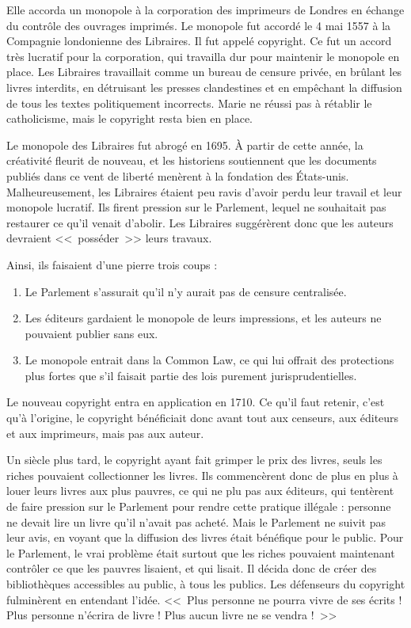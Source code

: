 Elle accorda un monopole à la corporation des imprimeurs de Londres en échange du contrôle des ouvrages imprimés.
Le monopole fut accordé le 4 mai 1557 à la Compagnie londonienne des Libraires. Il fut appelé copyright.
Ce fut un accord très lucratif pour la corporation, qui travailla dur pour maintenir le monopole en place.
Les Libraires travaillait comme un bureau de censure privée, en brûlant les livres interdits, en détruisant les presses clandestines et en empêchant la diffusion de tous les textes politiquement incorrects.
Marie ne réussi pas à rétablir le catholicisme, mais le copyright resta bien en place.

Le monopole des Libraires fut abrogé en 1695.
À partir de cette année, la créativité fleurit de nouveau, et les historiens soutiennent que les documents publiés dans ce vent de liberté menèrent à la fondation des États-unis.
Malheureusement, les Libraires étaient peu ravis d'avoir perdu leur travail et leur monopole lucratif.
Ils firent pression sur le Parlement, lequel ne souhaitait pas restaurer ce qu'il venait d'abolir.
Les Libraires suggérèrent donc que les auteurs devraient <<~posséder~>> leurs travaux.

Ainsi, ils faisaient d'une pierre trois coups :

\begin{enumerate}
\item Le Parlement s'assurait qu'il n'y aurait pas de censure centralisée.
\item Les éditeurs gardaient le monopole de leurs impressions, et les auteurs ne pouvaient publier sans eux.
\item Le monopole entrait dans la Common Law, ce qui lui offrait des protections plus fortes que s'il faisait partie des lois purement jurisprudentielles.
\end{enumerate}\bigskip

Le nouveau copyright entra en application en 1710.
Ce qu'il faut retenir, c'est qu'à l'origine, le copyright bénéficiait donc avant tout aux censeurs, aux éditeurs et aux imprimeurs, mais pas aux auteur.

Un siècle plus tard, le copyright ayant fait grimper le prix des livres, seuls les riches pouvaient collectionner les livres.
Ils commencèrent donc de plus en plus à louer leurs livres aux plus pauvres, ce qui ne plu pas aux éditeurs, qui tentèrent de faire pression sur le Parlement pour rendre cette pratique illégale : personne ne devait lire un livre qu'il n'avait pas acheté.
Mais le Parlement ne suivit pas leur avis, en voyant que la diffusion des livres était bénéfique pour le public.
Pour le Parlement, le vrai problème était surtout que les riches pouvaient maintenant contrôler ce que les pauvres lisaient, et qui lisait.
Il décida donc de créer des bibliothèques accessibles au public, à tous les publics.
Les défenseurs du copyright fulminèrent en entendant l'idée.
<<~Plus personne ne pourra vivre de ses écrits ! Plus personne n'écrira de livre ! Plus aucun livre ne se vendra !~>>

